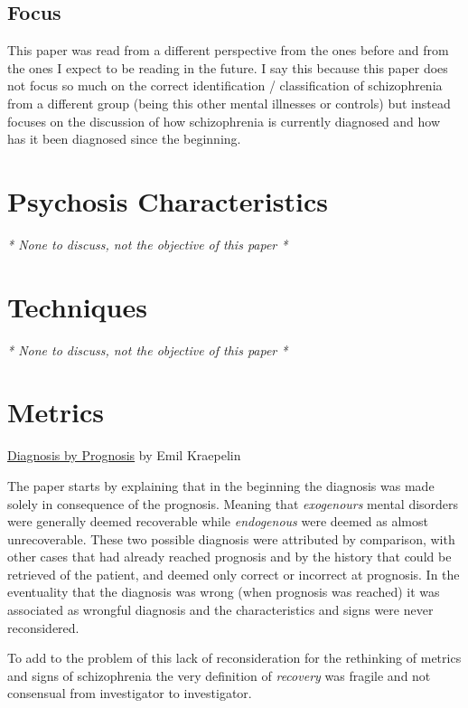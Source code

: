 \documentclass{Paper_Summary}
\begin{document}
\makepapertitle

\breakline

\begin{center}
    \section*{Focus}
\end{center}
    This paper was read from a different perspective from the ones before and from the ones I expect to be reading in the future. I say this because this paper does not focus so much on the correct identification / classification of schizophrenia from a different group (being this other mental illnesses or controls) but instead focuses on the discussion of how schizophrenia is currently diagnosed and how has it been diagnosed since the beginning.

\breakline

\newpage

\section{Psychosis Characteristics}
\emph{* None to discuss, not the objective of this paper *}

\section{Techniques}
\emph{* None to discuss, not the objective of this paper *}

\section{Metrics}

\underline{Diagnosis by Prognosis} by Emil Kraepelin

    The paper starts by explaining that in the beginning the diagnosis was made solely in consequence of the prognosis. Meaning that \emph{exogenours} mental disorders were generally deemed recoverable while \emph{endogenous} were deemed as almost unrecoverable.
    These two possible diagnosis were attributed by comparison, with other cases that had already reached prognosis and by the history that could be retrieved of the patient, and deemed only correct or incorrect at prognosis. In the eventuality that the diagnosis was wrong (when prognosis was reached) it was associated as wrongful diagnosis and the characteristics and signs were never reconsidered.

    To add to the problem of this lack of reconsideration for the rethinking of metrics and signs of schizophrenia the very definition of \emph{recovery} was fragile and not consensual from investigator to investigator.
\end{document}
